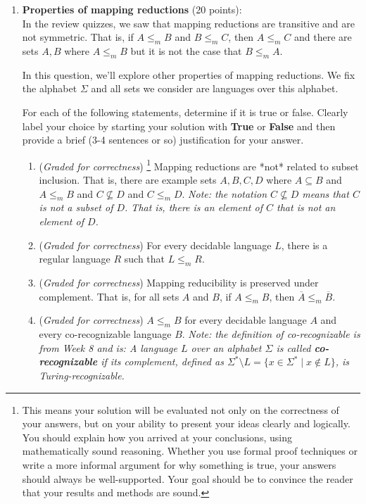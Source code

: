 \documentclass[12pt, oneside]{article}
\newcommand{\gradeCorrect}{({\it Graded for correctness}) }
\newcommand{\gradeCorrectFirst}{\gradeCorrect\footnote{This means your solution 
will be evaluated not only on the correctness of your answers, but on your ability
to present your ideas clearly and logically. You should explain how you 
arrived at your conclusions, using
mathematically sound reasoning. Whether you use formal proof techniques or 
write a more informal argument
for why something is true, your answers should always be well-supported. 
Your goal should be to convince the
reader that your results and methods are sound.} }
\begin{document}
\begin{enumerate} 


\item \textbf{Properties of mapping reductions} (20 points): \\
In the review quizzes, we saw that
mapping reductions are transitive and are
not symmetric. That is, if $A \le_m B$ and $B \le_m C$, then $A \le_m C$ and there are sets 
$A, B$ where $A \le_m B$ but it is not 
the case that $B \le_m A$.

In this question, we'll explore other 
properties of mapping reductions.
We fix the alphabet $\Sigma$ and 
all sets we consider are languages
over this alphabet.

For each of the following statements, determine if it is true or false. 
Clearly label your choice 
by starting your solution with {\bf True} or {\bf False} and then
provide a brief (3-4 sentences or so) justification for your answer.

\begin{enumerate}
\item\gradeCorrectFirst Mapping reductions are *not* related to subset inclusion. 
That is, there are example sets $A,B,C,D$ where
$A \subseteq B$ and $A \leq_m B$ and 
$C \not \subseteq D$ and $C \leq_m D$.
{\it Note: the notation $C \not \subseteq D$ means 
that $C$ is not a subset of $D$. That is, there is 
an element of $C$ that is not an element of $D$.}

\item\gradeCorrect For every decidable language $L$, there is a regular language 
$R$ such that $L \le_m R$.

\item\gradeCorrect Mapping reducibility is preserved under complement. That is, 
for all sets $A$ and $B$, if $A \le_m B$, then $\overline{A} \le_m \overline{B}$.

\item\gradeCorrect $A \le_m B$ for every decidable language $A$ and every co-recognizable language $B$. {\it Note: the definition of co-recognizable
is from Week 8 and is: A language $L$ over an  alphabet 
$\Sigma$ is called {\bf co-recognizable} if its complement,  defined
as $\Sigma^* \setminus L  = \{ x  \in  \Sigma^* \mid x \notin  L \}$,
is Turing-recognizable.
}

\end{enumerate}





\end{enumerate}
\end{document}
